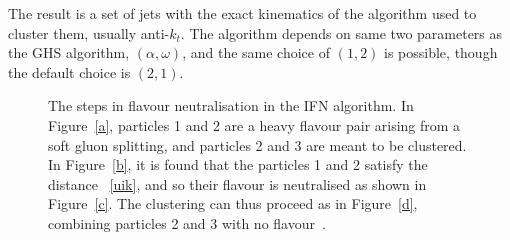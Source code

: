 \documentclass[10pt,a4paper]{book}
\begin{document}
The result is a set of jets with the exact kinematics of the algorithm used to cluster them, usually anti-$k_t$. The algorithm depends on same two parameters as the GHS algorithm, $(\alpha, \omega)$, and the same choice of $(1,2)$ is possible, though the default choice is $(2,1)$.

\begin{figure}
    \centering

    \caption{The steps in flavour neutralisation in the IFN algorithm. In Figure~\ref{a}, particles 1 and 2 are a heavy flavour pair arising from a soft gluon splitting, and particles 2 and 3 are meant to be clustered. In Figure~\ref{b}, it is found that the particles 1 and 2 satisfy the distance ~\ref{uik}, and so their flavour is neutralised as shown in Figure~\ref{c}. The clustering can thus proceed as in Figure~\ref{d}, combining particles 2 and 3 with no flavour~\cite{Caola:2023wpj}.}
    \label{fig:ifn}
\end{figure}
\end{document}
